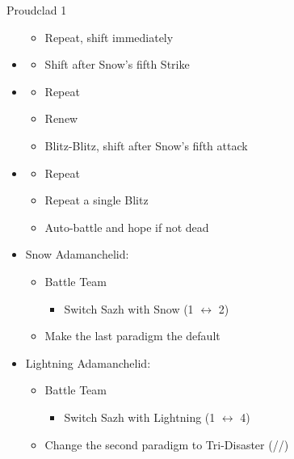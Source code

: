 \begin{multicols}{2}
\begin{battle}{Proudclad 1}
\begin{itemize}
\begin{itemize}
        \item Repeat, shift immediately
    \end{itemize}
    \item \sixth
    \begin{itemize}
        \item Shift after Snow's fifth Strike
    \end{itemize}
    \item \first
    \begin{itemize}
        \item Repeat
        \item Renew
        \item Blitz-Blitz, shift after Snow's fifth attack
    \end{itemize}
    \item \second
    \begin{itemize}
        \item Repeat
        \item Repeat a single Blitz
        \item Auto-battle and hope if not dead
    \end{itemize}
\end{itemize}
\end{battle}
\vfill
\begin{menu}
\begin{itemize}
    \item Snow Adamanchelid:
    \begin{itemize}
    \paradigm
    \begin{itemize}
        \item Battle Team
        \begin{itemize}
            \item Switch Sazh with Snow (1 $\leftrightarrow$ 2)
        \end{itemize}
        \item Make the last paradigm the default
    \end{itemize}
    \end{itemize}
    \item Lightning Adamanchelid:
    \begin{itemize}
    		\paradigm
    		\begin{itemize}
    		\item Battle Team
    		\begin{itemize}
    			\item Switch Sazh with Lightning (1 $\leftrightarrow$ 4)
    		\end{itemize}
    		        \item Change the second paradigm to Tri-Disaster (\rav/\rav/\rav)
\end{itemize}
\end{itemize}
\end{itemize}
\end{menu}


\end{multicols}
